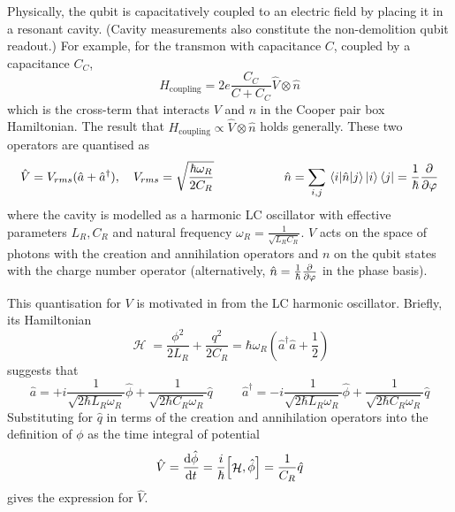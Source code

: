 \documentclass[11pt]{article}
\DeclareMathOperator{\ham}{\mathcal{H}}
\begin{document}
Physically, the qubit is capacitatively coupled to an electric field by placing it in a resonant cavity. (Cavity measurements also constitute the non-demolition qubit readout.) For example, for the transmon with capacitance $C$, coupled by a capacitance $C_C$,
\begin{equation}
H_\text{coupling} = 2e \frac{C_C}{C + C_C} \hat{V} \otimes \hat{n} 
\end{equation}
which is the cross-term that interacts $V$ and $n$ in the Cooper pair box Hamiltonian. The result that $H_\text{coupling} \propto \hat{V} \otimes \hat{n}$ holds generally. These two operators are quantised as 
\begin{equation}
\hat{V} = V_{rms} (\hat{a} + \hat{a}^\dagger),
\quad
V_{rms} = \sqrt{\frac{\hbar \omega_R}{2 C_R}}
\hspace{2cm}
\hat{n} = \sum_{i,j} \matrixel{i}{\hat{n}}{j} \ket{i} \bra{j} = \frac{1}{\hbar} \pdv{\varphi}
\end{equation}
where the cavity is modelled as a harmonic LC oscillator with effective parameters $L_R, C_R$ and natural frequency $\omega_R = \frac{1}{\sqrt{L_R C_R}}$.  $V$ acts on the space of photons with the creation and annihilation operators and $n$ on the qubit states with the charge number operator (alternatively, $\hat{n} = \frac{1}{\hbar} \pdv{\varphi}$ in the phase basis). 

This quantisation for $V$ is motivated in \cite{girvin2011superconducting} from the LC harmonic oscillator. Briefly, its Hamiltonian
\begin{equation}
\ham = \frac{\phi^2}{2L_R} + \frac{q^2}{2C_R} = \hbar \omega_R \left(\hat{a}^\dagger \hat{a} + \frac{1}{2}\right)
\end{equation}
suggests that
\begin{equation}
\hat{a} = + i \frac{1}{\sqrt{2 \hbar L_R \omega_R}} \hat{\phi} + \frac{1}{\sqrt{2 \hbar C_R \omega_R}} \hat{q}
\hspace{1cm}
\hat{a}^\dagger = - i \frac{1}{\sqrt{2 \hbar L_R \omega_R}} \hat{\phi} + \frac{1}{\sqrt{2 \hbar C_R \omega_R}} \hat{q}
\end{equation}
Substituting for $\hat{q}$ in terms of the creation and annihilation operators into the definition of $\phi$ as the time integral of potential
\begin{equation}
\hat{V} = \dv{\hat{\phi}}{t} = \frac{i}{\hbar} \comm{\ham}{\hat{\phi}} = \frac{1}{C_R} \hat{q}
\end{equation}
gives the expression for $\hat{V}$.
\end{document}
